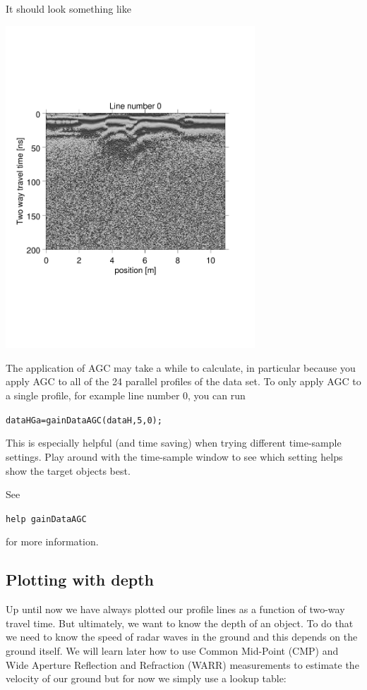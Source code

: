 \documentclass[11pt]{article}
\begin{document}
It should look something like
\begin{center}
\includegraphics[width=0.7\textwidth, trim = 0.9cm 6cm 2cm
  6.5cm,clip]{figures/GPRlineHGa0}
\end{center}

The application of AGC may take a while to calculate, in particular
because you apply AGC to all of the 24 parallel profiles of the data set. To
only apply AGC to a single profile, for example line number 0, you can
run

\qquad \verb#dataHGa=gainDataAGC(dataH,5,0);#

This is especially helpful (and time saving) when trying different
time-sample settings. Play around with the time-sample window to see
which setting helps show the target objects best.

See

\qquad \verb#help gainDataAGC#

for more information.


\subsection{Plotting with depth}

Up until now we have always plotted our profile lines as a function of
two-way travel time. But ultimately, we want to know the depth of an
object. To do that we need to know the speed of radar waves in the
ground and this depends on the ground itself. We will learn later how
to use Common Mid-Point (CMP) and Wide Aperture Reflection and
Refraction (WARR) measurements to estimate the velocity of our ground
but for now we simply use a lookup table:
  
\end{document}
